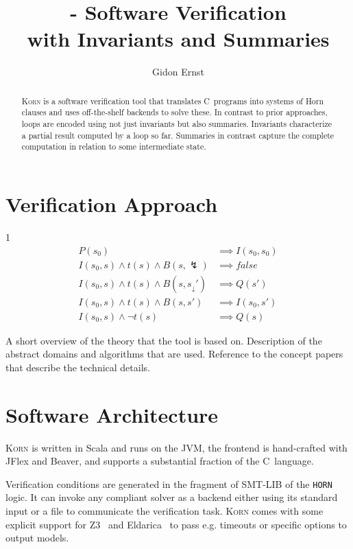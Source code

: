 \documentclass{llncs}
\author{Gidon Ernst}
\title{\Korn - Software Verification \\ with Invariants and Summaries}
\institute{LMU Munich \\ \mailto{gidon.ernst@lmu.de}}
\newcommand{\Korn}{\textsc{Korn}\xspace}
\newcommand{\err}{\lightning}
\newcommand{\brk}[1]{{#1}_\downarrow}
\newcommand{\False}{\mathit{false}}
\begin{document}
\maketitle

\begin{abstract}
    \Korn is a software verification tool that translates
    C~programs into systems of Horn clauses
    and uses off-the-shelf backends to solve these.
    In contrast to prior approaches, loops are encoded using
    not just invariants but also summaries.
    Invariants characterize a partial result computed by a loop so far.
    Summaries in contrast capture the complete computation in relation to some intermediate state.
\end{abstract}

\section{Verification Approach}
\label{sec:approach}
1
\begin{align*}
    P(s_0)
        & \implies I(s_0,s_0) \\
    I(s_0,s) \land t(s) \land B(s,\err)
        & \implies \False \\
    I(s_0,s) \land t(s) \land B(s,\brk s')
        & \implies Q(s') \\
    I(s_0,s) \land t(s) \land B(s,s')
        & \implies I(s_0,s') \\
    I(s_0,s) \land \lnot t(s)
        & \implies Q(s)
\end{align*}

\cite{hoare1969axiomatic}
A short overview of the theory that the tool is based on. Description of the abstract domains and algorithms that are used. Reference to the concept papers that describe the technical details.

\section{Software Architecture}
\label{sec:architecture}

\Korn is written in Scala and runs on the JVM,
the frontend is hand-crafted with JFlex and Beaver,
and supports a substantial fraction of the C~language.

Verification conditions are generated in the fragment of SMT-LIB of the \texttt{HORN} logic.
It can invoke any compliant solver as a backend either using its standard input or a file to communicate the verification task.
\Korn comes with some explicit support for Z3~\cite{gurfinkel2019science} and Eldarica~\cite{hojjat2018eldarica}
to pass e.g. timeouts or specific options to output models.
\end{document}

